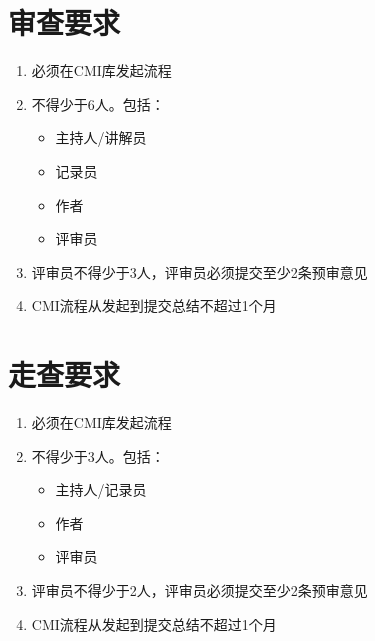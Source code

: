 ﻿\documentclass[11pt]{article}
\begin{document}
\section{审查要求}
\begin{enumerate}
\item 必须在CMI库发起流程
\item 不得少于6人。包括：
  \begin{itemize}
  \item 主持人/讲解员
  \item 记录员
  \item 作者
  \item 评审员
  \end{itemize}
\item 评审员不得少于3人，评审员必须提交至少2条预审意见
\item CMI流程从发起到提交总结不超过1个月
\end{enumerate}

\section{走查要求}
\begin{enumerate}
\item 必须在CMI库发起流程
\item 不得少于3人。包括：
  \begin{itemize}
  \item 主持人/记录员
  \item 作者
  \item 评审员
  \end{itemize}
\item 评审员不得少于2人，评审员必须提交至少2条预审意见
\item CMI流程从发起到提交总结不超过1个月
\end{enumerate}
\end{document}
